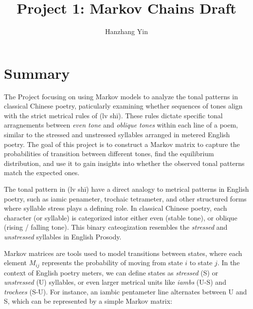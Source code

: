 \documentclass[12pt]{article}
\title{Project 1: Markov Chains Draft}
\author{Hanzhang Yin}
\begin{document}
\maketitle

\section{Summary}

The Project focusing on using Markov models to analyze the tonal patterns in classical Chinese poetry, paticularly examining whether sequences of tones align with the strict metrical rules of 
(lv shī). These rules dictate specific tonal arragnements between \textit{even tone} and \textit{oblique tones} within each line of a poem, similar to the stressed and unstressed syllables arranged in metered English
poetry. The goal of this project is to construct a Markov matrix to capture the probabilities of transition between different tones, find the equilibrium distribution, and use it to gain 
insights into whether the observed tonal patterns match the expected ones.

The tonal pattern in (lv shī) have a direct analogy to metrical patterns in English poetry, such as iamic penameter, trochaic tetrameter, and other structured forms where syllable stress plays a defining role.
In classical Chinese poetry, each character (or syllable) is categorized intor either even (stable tone), or oblique (rising / falling tone). This binary cateogization resembles the \textit{stressed} and \textit{unstressed} syllables 
in English Prosody.


Markov matrices are tools used to model transitions between states, where each element \( M_{ij} \) represents the probability of moving from state \( i \) to state \( j \). 
In the context of English poetry meters, we can define states as \textit{stressed} (S) or \textit{unstressed} (U) syllables, or even larger metrical units like \textit{iambs} (U-S) and \textit{trochees} (S-U). 
For instance, an iambic pentameter line alternates between U and S, which can be represented by a simple Markov matrix: 
\end{document}
